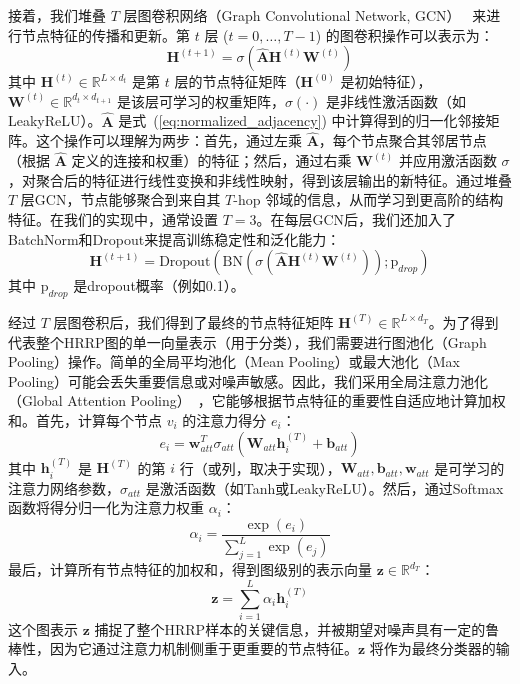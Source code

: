 接着，我们堆叠 $T$ 层图卷积网络（Graph Convolutional Network, GCN）~\cite{kipf_semi-supervised_2017} 来进行节点特征的传播和更新。第 $t$ 层 ($t=0, \dots, T-1$) 的图卷积操作可以表示为：
\begin{equation}
    \mathbf{H}^{(t+1)} = \sigma\left(\hat{\mathbf{A}} \mathbf{H}^{(t)} \mathbf{W}^{(t)}\right)
    \label{eq:gcn_layer}
\end{equation}
其中 $\mathbf{H}^{(t)} \in \mathbb{R}^{L \times d_t}$ 是第 $t$ 层的节点特征矩阵（$\mathbf{H}^{(0)}$ 是初始特征），$\mathbf{W}^{(t)} \in \mathbb{R}^{d_t \times d_{t+1}}$ 是该层可学习的权重矩阵，$\sigma(\cdot)$ 是非线性激活函数（如LeakyReLU）。$\hat{\mathbf{A}}$ 是式~(\ref{eq:normalized_adjacency}) 中计算得到的归一化邻接矩阵。这个操作可以理解为两步：首先，通过左乘 $\hat{\mathbf{A}}$，每个节点聚合其邻居节点（根据 $\hat{\mathbf{A}}$ 定义的连接和权重）的特征；然后，通过右乘 $\mathbf{W}^{(t)}$ 并应用激活函数 $\sigma$，对聚合后的特征进行线性变换和非线性映射，得到该层输出的新特征。通过堆叠 $T$ 层GCN，节点能够聚合到来自其 $T$-hop 邻域的信息，从而学习到更高阶的结构特征。在我们的实现中，通常设置 $T=3$。在每层GCN后，我们还加入了BatchNorm和Dropout来提高训练稳定性和泛化能力：
\begin{equation}
    \mathbf{H}^{(t+1)} = \text{Dropout}\left(\text{BN}\left(\sigma\left(\hat{\mathbf{A}} \mathbf{H}^{(t)} \mathbf{W}^{(t)}\right)\right); \text{p}_{drop}\right)
    \label{eq:gcn_layer_full}
\end{equation}
其中 $\text{p}_{drop}$ 是dropout概率（例如0.1）。

经过 $T$ 层图卷积后，我们得到了最终的节点特征矩阵 $\mathbf{H}^{(T)} \in \mathbb{R}^{L \times d_T}$。为了得到代表整个HRRP图的单一向量表示（用于分类），我们需要进行图池化（Graph Pooling）操作。简单的全局平均池化（Mean Pooling）或最大池化（Max Pooling）可能会丢失重要信息或对噪声敏感。因此，我们采用全局注意力池化（Global Attention Pooling）~\cite{velickovic2018graph}，它能够根据节点特征的重要性自适应地计算加权和。首先，计算每个节点 $v_i$ 的注意力得分 $e_i$：
\begin{equation}
    e_i = \mathbf{w}_{att}^T \sigma_{att}(\mathbf{W}_{att} \mathbf{h}_i^{(T)} + \mathbf{b}_{att})
    \label{eq:attention_score_node}
\end{equation}
其中 $\mathbf{h}_i^{(T)}$ 是 $\mathbf{H}^{(T)}$ 的第 $i$ 行（或列，取决于实现），$\mathbf{W}_{att}, \mathbf{b}_{att}, \mathbf{w}_{att}$ 是可学习的注意力网络参数，$\sigma_{att}$ 是激活函数（如Tanh或LeakyReLU）。然后，通过Softmax函数将得分归一化为注意力权重 $\alpha_i$：
\begin{equation}
    \alpha_i = \frac{\exp(e_i)}{\sum_{j=1}^L \exp(e_j)}
    \label{eq:attention_weight_node}
\end{equation}
最后，计算所有节点特征的加权和，得到图级别的表示向量 $\mathbf{z} \in \mathbb{R}^{d_T}$：
\begin{equation}
    \mathbf{z} = \sum_{i=1}^L \alpha_i \mathbf{h}_i^{(T)}
    \label{eq:graph_representation}
\end{equation}
这个图表示 $\mathbf{z}$ 捕捉了整个HRRP样本的关键信息，并被期望对噪声具有一定的鲁棒性，因为它通过注意力机制侧重于更重要的节点特征。$\mathbf{z}$ 将作为最终分类器的输入。

